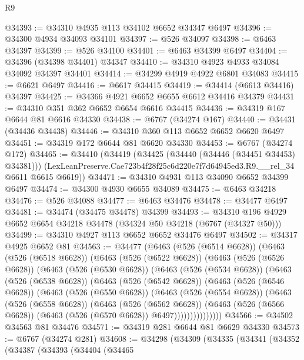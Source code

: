 \begin{lexlean}{R9}
\begin{coremodule}
@34393 := @34310 @4935 @113 @34102 @6652 @34347 @6497
@34396 := @34300 @4934 @34093 @34101
@34397 := @526 @34097
@34398 := @6463 @34397
@34399 := @526 @34100
@34401 := @6463 @34399 @6497
@34404 := @34396 (@34398 @34401) @34347
@34410 := @34310 @4923 @4933 @34084 @34092 @34397 @34401
@34414 := @34299 @4919 @4922 @6801 @34083
@34415 := @6621 @6497
@34416 := @6617 @34415
@34419 := @34414 (@6613 @34416) @34397
@34425 := @34366 @4921 @6652 @6655 @6612 @34416 @34379
@34431 := @34310 @351 @362 @6652 @6654 @6616 @34415
@34436 := @34319 @167 @6644 @81 @6616 @34330
@34438 := @6767 (@34274 @167)
@34440 := @34431 (@34436 @34438)
@34446 := @34310 @360 @113 @6652 @6652 @6620 @6497
@34451 := @34319 @172 @6644 @81 @6620 @34330
@34453 := @6767 (@34274 @172)
@34465 := @34410
    (@34419
      (@34425 (@34440 (@34446 (@34451 @34453) @34381)))
      (LexLeanPreserve.Cae723b4f28f25c6d220e7f7d64945ed3.R9.__rel_34 @6611 @6615 @6619))
@34471 := @34310 @4931 @113 @34090 @6652 @34399 @6497
@34474 := @34300 @4930 @6655 @34089
@34475 := @6463 @34218
@34476 := @526 @34088
@34477 := @6463 @34476
@34478 := @34477 @6497
@34481 := @34474 (@34475 @34478) @34399
@34493 := @34310 @196 @4929 @6652 @6654 @34218 @34478 (@34324 @50 @34218 (@6767 (@34327 @50)))
@34499 := @34310 @4927 @113 @6652 @6652 @34476 @6497
@34502 := @34317 @4925 @6652 @81
@34563 := @34477
    (@6463
      (@526 (@6514 @6628))
      (@6463
        (@526 (@6518 @6628))
        (@6463
          (@526 (@6522 @6628))
          (@6463
            (@526 (@6526 @6628))
            (@6463
              (@526 (@6530 @6628))
              (@6463
                (@526 (@6534 @6628))
                (@6463
                  (@526 (@6538 @6628))
                  (@6463
                    (@526 (@6542 @6628))
                    (@6463
                      (@526 (@6546 @6628))
                      (@6463
                        (@526 (@6550 @6628))
                        (@6463
                          (@526 (@6554 @6628))
                          (@6463
                            (@526 (@6558 @6628))
                            (@6463
                              (@526 (@6562 @6628))
                              (@6463
                                (@526 (@6566 @6628))
                                (@6463 (@526 (@6570 @6628)) @6497)))))))))))))))
@34566 := @34502 @34563 @81 @34476
@34571 := @34319 @281 @6644 @81 @6629 @34330
@34573 := @6767 (@34274 @281)
@34608 := @34298
    (@34309
      (@34335
        (@34341
          (@34352
            (@34387
              (@34393
                (@34404
                  (@34465

\end{coremodule}
\end{lexlean}
